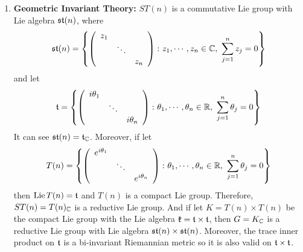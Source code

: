 \documentclass[a4paper,12pt]{article}
\begin{document}
\begin{enumerate}
		\item \textbf{Geometric Invariant Theory:} $ST(n)$ is a commutative Lie group with Lie algebra $\mathfrak{st}(n)$, where
		\begin{equation*}
			\mathfrak{st}(n) = \left\{\left(
				    \begin{array}{ccc}
				      z_1 & & \\
				      & \ddots &\\
				      &&z_n
				    \end{array}
				  \right) \colon z_1,\cdots,z_n \in \mathbb{C},~\sum_{j=1}^n z_j = 0\right\}
		\end{equation*}
		and let
		\begin{equation*}
			\mathfrak{t} =\left\{\left(
				    \begin{array}{ccc}
				      i\theta_1 & & \\
				      & \ddots &\\
				      &&i\theta_n
				    \end{array}
				  \right) \colon \theta_1,\cdots,\theta_n \in \mathbb{R},~\sum_{j=1}^n \theta_j = 0\right\}
		\end{equation*}
		It can see $\mathfrak{st}(n) = \mathfrak{t}_{\mathbb{C}}$. Moreover, if let
		\begin{equation*}
			T(n) = \left\{\left(
				    \begin{array}{ccc}
				      e^{i\theta_1} & & \\
				      & \ddots &\\
				      &&e^{i\theta_n}
				    \end{array}
				  \right) \colon \theta_1,\cdots,\theta_n \in \mathbb{R},~\sum_{j=1}^n \theta_j = 0\right\}
		\end{equation*}
		then $\operatorname{Lie} T(n) = \mathfrak{t}$ and $T(n)$ is a compact Lie group. Therefore, $ST(n) = T(n)_{\mathbb{C}}$ is a reductive Lie group. And if let $K = T(n) \times T(n)$ be the compact Lie group with the Lie algebra $\mathfrak{k} = \mathfrak{t} \times \mathfrak{t}$, then $G =K_{\mathbb{C}}$ is a reductive Lie group with Lie algebra $\mathfrak{st}(n) \times \mathfrak{st}(n)$. Moreover, the trace inner product on $\mathfrak{t}$ is a bi-invariant Riemannian metric so it is also valid on $\mathfrak{t} \times \mathfrak{t}$.


\end{enumerate}
\end{document}
